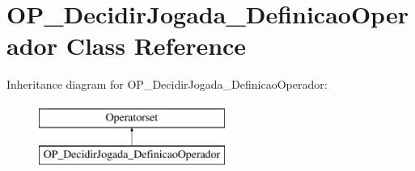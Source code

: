 \hypertarget{classOP__DecidirJogada__DefinicaoOperador}{
\section{OP\_\-DecidirJogada\_\-DefinicaoOperador Class Reference}
\label{classOP__DecidirJogada__DefinicaoOperador}
}
Inheritance diagram for OP\_\-DecidirJogada\_\-DefinicaoOperador:\begin{figure}[H]
\begin{center}
\leavevmode
\includegraphics[height=2.000000cm]{classOP__DecidirJogada__DefinicaoOperador}
\end{center}
\end{figure}
